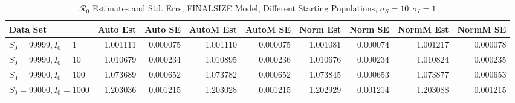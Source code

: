 \documentclass[12pt]{article}
\newcommand{\rr}{\ensuremath{\mathcal{R}_0}}
\begin{document}
\begin{table}[H]
	
	\caption{$\rr$ Estimates and Std. Errs, FINALSIZE Model,
		Different Starting Populations, 
		$\sigma_S = 10, \sigma_I = 1$}
	\begin{footnotesize}
		\hskip -1.7cm
	\begin{tabular}{l|r|r|r|r|r|r|r|r}
		\hline
		Data Set & Auto Est & Auto SE & AutoM Est & AutoM SE & Norm Est & Norm SE & NormM Est & NormM SE\\
		\hline
		$S_0 = 99999, I_0 = 1$ & 1.001111 & 0.000075 & 1.001110 & 0.000075 & 1.001081 & 0.000074 & 1.001217 & 0.000078\\
		\hline
		$S_0 = 99990, I_0 = 10$ & 1.010679 & 0.000234 & 1.010895 & 0.000236 & 1.010676 & 0.000234 & 1.010824 & 0.000235\\
		\hline
		$S_0 = 99900, I_0 = 100$ & 1.073689 & 0.000652 & 1.073782 & 0.000652 & 1.073845 & 0.000653 & 1.073877 & 0.000653\\
		\hline
		$S_0 = 99000, I_0 = 1000$ & 1.203036 & 0.001215 & 1.203028 & 0.001215 & 1.202929 & 0.001214 & 1.203088 & 0.001215\\
		\hline
	\end{tabular}
\end{footnotesize}
\end{table}
\end{document}
